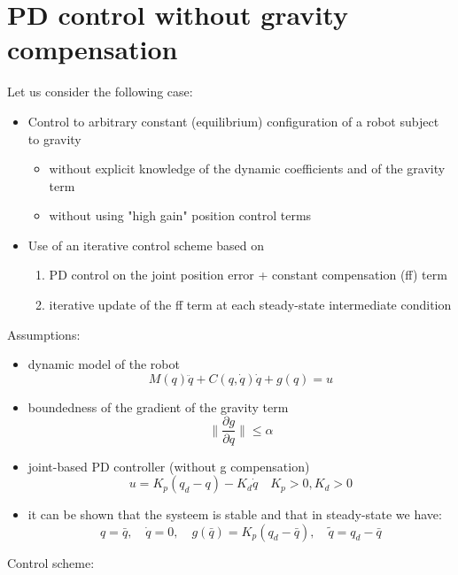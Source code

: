 \documentclass{book}
\begin{document}
\section{PD control without gravity compensation}
Let us consider the following case:
\begin{itemize}
    \item Control to arbitrary constant (equilibrium) configuration of a robot subject to gravity \begin{itemize}
            \item without explicit knowledge of the dynamic coefficients and of the gravity term
            \item without using "high gain" position control terms
        \end{itemize}
    \item Use of an iterative control scheme based on \begin{enumerate}
            \item PD control on the joint position error + constant compensation (ff) term 
            \item iterative update of the ff term at each steady-state intermediate condition
        \end{enumerate}
\end{itemize}
Assumptions: 
\begin{itemize}
    \item dynamic model of the robot \[
            M(q)\ddot{q}+C(q,\dot{q})\dot{q}+g(q)=u
        \]
    \item boundedness of the gradient of the gravity term \[
            \|\displaystyle\frac{\partial g}{\partial q}\| \leq \alpha
        \] 
    \item joint-based PD controller (without g compensation) \[
            u= K_p(q_d-q) -K_d\dot{q} \quad K_p>0,K_d> 0
        \]
    \item it can be shown that the systeem is stable and that in steady-state we have:\[
            q=\bar{q},\quad \dot{q}=0,\quad g(\bar{q})=K_p(q_d-\bar{q}),\quad \tilde{q}=q_d-\bar{q}
        \]
\end{itemize}
Control scheme:
\end{document}
